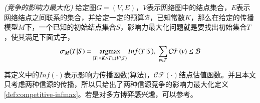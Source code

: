 \begin{definition}
\emph{(竞争的影响力最大化)}
\label{def:competitive-infmax}
给定图$G=(V, E)$，$V$表示网络图中的结点集合，$E$表示网络结点之间联系的集合，并给定一定的预算$\mathcal{B}$，已知常数$K$，那么在给定的传播模型$M$下，一个已知的初始结点集合$S$，影响力最大化问题就是要找出初始集合$T$，使其满足下面式子，
\begin{displaymath}
\sigma_{M}(T|S) = \mathop{\rm argmax} \limits_{|T|=K \wedge T \subseteq (V \setminus S)} Inf(T|S), ~ \sum_{v \in T} \mathcal{CF}(v) \leq \mathcal{B}
\end{displaymath}
\end{definition}

其定义中的$Inf(\cdot)$表示影响力传播函数(算法)，$\mathcal{CF}(\cdot)$结点估值函数。并且本文只考虑两种信源的传播，所以只给出了两种信源竞争的影响力最大化定义\ref{def:competitive-infmax}。若是对多方博弈感兴趣，可以参考\cite{bharathi2007competitive}。


